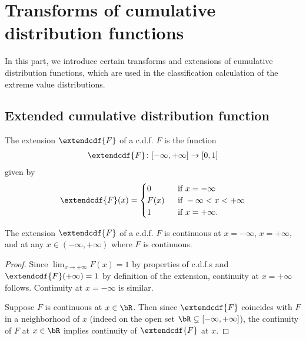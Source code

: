 \chapter{Transforms of cumulative distribution functions}

In this part, we introduce certain transforms and extensions of
cumulative distribution functions, which are used in the classification
calculation of the extreme value distributions.


\section{Extended cumulative distribution function}

\begin{definition}
  \label{def:cdf-extend}
  \leanok
  The extension $\extendcdf{F}$ of a c.d.f. $F$ is the function
  \begin{align*}
    \extendcdf{F} \colon [-\infty,+\infty] \to [0,1]
  \end{align*}
  given by
  \begin{align*}
    \extendcdf{F}(x) = \begin{cases}
      0 & \; \text{ if } x = -\infty \\
      F(x) & \; \text{ if } -\infty < x < +\infty \\
      1 & \; \text{ if } x = +\infty .
      \end{cases}
  \end{align*}
\end{definition}

\begin{lemma}
  \label{lem:cdf-extend-continuity-pts}
  \leanok
  The extension $\extendcdf{F}$ of a c.d.f. $F$ is continuous
  at $x = -\infty$, $x = + \infty$, and at any
  $x \in (-\infty,+\infty)$ where $F$ is continuous.
\end{lemma}
\begin{proof}
  Since $\lim_{x \to +\infty} F(x) = 1$ by properties of c.d.f.s
  and $\extendcdf{F}(+\infty) = 1$ by definition of the extension,
  continuity at $x = + \infty$ follows. Continuity at $x=-\infty$
  is similar.

  Suppose $F$ is continuous at $x \in \bR$.
  Then since $\extendcdf{F}$ coincides with $F$
  in a neighborhood of $x$
  (indeed on the open set $\bR \subsetneq [-\infty,+\infty]$),
  the continuity of $F$ at $x \in \bR$ implies
  continuity of $\extendcdf{F}$ at $x$.
\end{proof}

